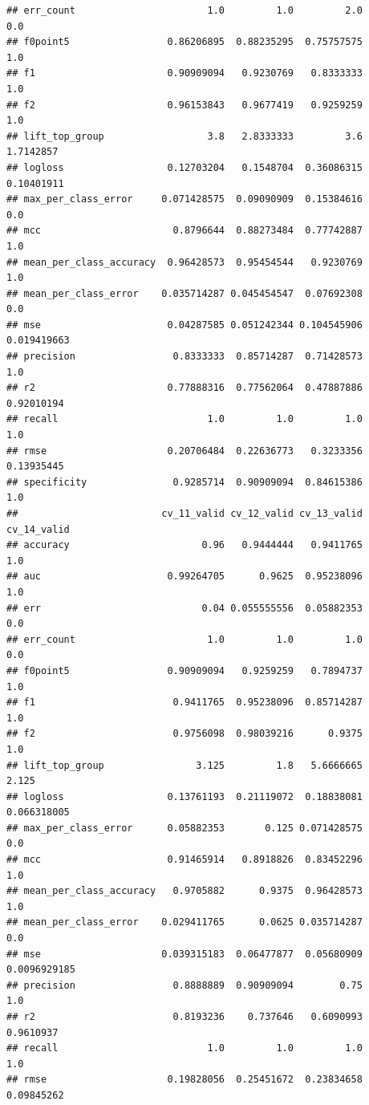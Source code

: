 \documentclass[]{article}
\begin{document}
\begin{verbatim}
## err_count                       1.0         1.0         2.0         0.0
## f0point5                 0.86206895  0.88235295  0.75757575         1.0
## f1                       0.90909094   0.9230769   0.8333333         1.0
## f2                       0.96153843   0.9677419   0.9259259         1.0
## lift_top_group                  3.8   2.8333333         3.6   1.7142857
## logloss                  0.12703204   0.1548704  0.36086315  0.10401911
## max_per_class_error     0.071428575  0.09090909  0.15384616         0.0
## mcc                       0.8796644  0.88273484  0.77742887         1.0
## mean_per_class_accuracy  0.96428573  0.95454544   0.9230769         1.0
## mean_per_class_error    0.035714287 0.045454547  0.07692308         0.0
## mse                      0.04287585 0.051242344 0.104545906 0.019419663
## precision                 0.8333333  0.85714287  0.71428573         1.0
## r2                       0.77888316  0.77562064  0.47887886  0.92010194
## recall                          1.0         1.0         1.0         1.0
## rmse                     0.20706484  0.22636773   0.3233356  0.13935445
## specificity               0.9285714  0.90909094  0.84615386         1.0
##                         cv_11_valid cv_12_valid cv_13_valid  cv_14_valid
## accuracy                       0.96   0.9444444   0.9411765          1.0
## auc                      0.99264705      0.9625  0.95238096          1.0
## err                            0.04 0.055555556  0.05882353          0.0
## err_count                       1.0         1.0         1.0          0.0
## f0point5                 0.90909094   0.9259259   0.7894737          1.0
## f1                        0.9411765  0.95238096  0.85714287          1.0
## f2                        0.9756098  0.98039216      0.9375          1.0
## lift_top_group                3.125         1.8   5.6666665        2.125
## logloss                  0.13761193  0.21119072  0.18838081  0.066318005
## max_per_class_error      0.05882353       0.125 0.071428575          0.0
## mcc                      0.91465914   0.8918826  0.83452296          1.0
## mean_per_class_accuracy   0.9705882      0.9375  0.96428573          1.0
## mean_per_class_error    0.029411765      0.0625 0.035714287          0.0
## mse                     0.039315183  0.06477877  0.05680909 0.0096929185
## precision                 0.8888889  0.90909094        0.75          1.0
## r2                        0.8193236    0.737646   0.6090993    0.9610937
## recall                          1.0         1.0         1.0          1.0
## rmse                     0.19828056  0.25451672  0.23834658   0.09845262

\end{verbatim}
\end{document}
